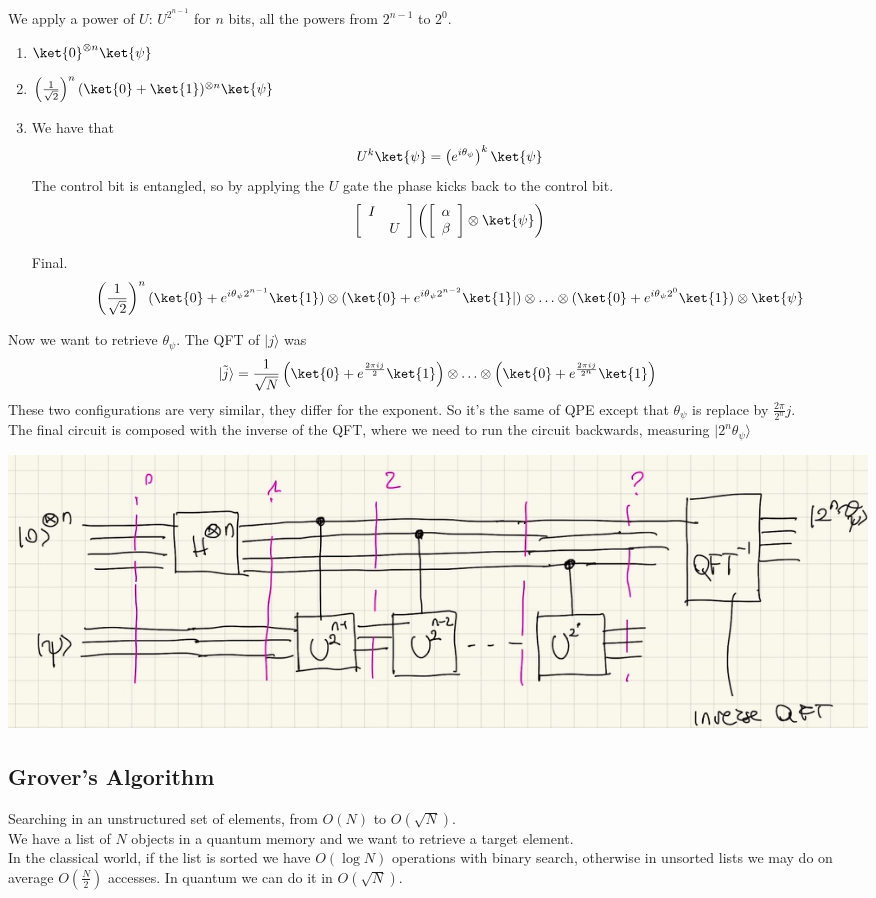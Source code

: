 \documentclass[10pt]{report}
\begin{document}
We apply a power of $U$: $U^{2^{n-1}}$ for $n$ bits, all the powers from $2^{n-1}$ to $2^0$.
\begin{enumerate}
	\item $\ket{0}^{\otimes n}\ket{\psi}$
	\item $\left(\frac{1}{\sqrt{2}}\right)^n (\ket{0}+\ket{1})^{\otimes n}\ket{\psi}$
	\item We have that $$U^k\ket{\psi} = \left(e^{i\theta_\psi}\right)^k\ket{\psi}$$
	The control bit is entangled, so by applying the $U$ gate the phase kicks back to the control bit.
	$$\left[\begin{array}{c c}
	I&\\
	&U
	\end{array}\right]\left(\left[\begin{array}{c}
	\alpha\\\beta
	\end{array}\right]\otimes\ket{\psi}\right)$$
	\item[Final.] $$\left(\frac{1}{\sqrt{2}}\right)^n (\ket{0}+e^{i\theta_\psi 2^{n-1}}\ket{1})\otimes(\ket{0}+e^{i\theta_\psi 2^{n-2}}\ket{1}|)\otimes\ldots\otimes(\ket{0}+e^{i\theta_\psi 2^{0}}\ket{1})\otimes\ket{\psi}$$
\end{enumerate}
Now we want to retrieve $\theta_\psi$. The QFT of $|j\rangle$ was $$|\tilde{j}\rangle = \frac{1}{\sqrt{N}}\left(\ket{0}+e^{\frac{2\pi ij}{2}}\ket{1}\right)\otimes\ldots\otimes\left(\ket{0}+e^{\frac{2\pi ij}{2^n}}\ket{1}\right)$$
These two configurations are very similar, they differ for the exponent. So it's the same of QPE except that $\theta_\psi$ is replace by $\frac{2\pi}{2^n}j$.\\
The final circuit is composed with the inverse of the QFT, where we need to run the circuit backwards, measuring $|2^n\theta_\psi\rangle$
\begin{center}
	\includegraphics[scale=0.5]{29.png}
\end{center}
\subsection{Grover's Algorithm} 
Searching in an unstructured set of elements, from $O(N)$ to $O(\sqrt{N})$.\\We have a list of $N$ objects in a quantum memory and we want to retrieve a target element.\\
In the classical world, if the list is sorted we have $O(\log N)$ operations with binary search, otherwise in unsorted lists we may do on average $O(\frac{N}{2})$ accesses. In quantum we can do it in $O(\sqrt{N})$.
\end{document}

